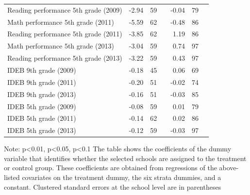 \documentclass[
	article,			%
	12pt,				%
	oneside,			%
	a4paper,			%
	]{article}
\begin{document}
\begin{table}[htbp]
\begin{threeparttable}
\begin{tabular}{p{27em}lrrrrr}
Reading performance 5th grade (2009) &      -2.94 &         59 &            &      -0.04 &         79 \\

Math performance 5th grade (2011) &      -5.59 &         62 &            &      -0.48 &         86 \\

Reading performance 5th grade (2011) &      -3.85 &         62 &            &       1.19 &         86 \\

Math performance 5th grade (2013) &      -3.04 &         59 &            &       0.74 &         97 \\

Reading performance 5th grade (2013) &      -3.22 &         59 &            &       0.43 &         97 \\

IDEB 9th grade (2009) &      -0.18 &         45 &            &       0.06 &         69 \\

IDEB 9th grade (2011) &      -0.20 &         51 &            &      -0.02 &         74 \\

IDEB 9th grade (2013) &      -0.16 &         51 &            &      -0.03 &         85 \\

IDEB 5th grade (2009) &      -0.08 &         59 &            &       0.01 &         79 \\

IDEB 5th grade (2011) &      -0.14 &         62 &            &       0.02 &         86 \\

IDEB 5th grade (2013) &      -0.12 &         59 &            &      -0.03 &         97 \\


\hline
\end{tabular}  
   \label{tab:pret_balancing}%
                                \begin{tablenotes}
              \fontsize{9}{9}\selectfont 
              \item 
              Note:   p<0.01,  p<0.05,  p<0.1 The table shows the coefficients of the dummy variable that identifies whether the selected schools are assigned to the treatment or control group. These coefficients are obtained from regressions of the above-listed covariates on the treatment dummy, the six strata dummies, and a constant. Clustered standard errors at the school level are in parentheses   
    \end{tablenotes}
     \end{threeparttable}
\end{table}%
\newpage
\end{document}

